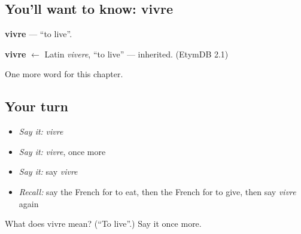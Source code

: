 \subsection*{You'll want to know: vivre}
\textbf{vivre} — \textquotedblleft{}to live\textquotedblright{}.

\begin{cousinweb}
\textbf{vivre} $\leftarrow$ Latin \emph{vivere}, \textquotedblleft{}to live\textquotedblright{} — inherited. (EtymDB 2.1)
\end{cousinweb}

\begin{grammarlens}[title={What you've built}]
One more word for this chapter.
\end{grammarlens}

\subsection*{Your turn}
\begin{itemize}
\raggedright
  \item \emph{Say it:} \emph{vivre}
  \item \emph{Say it:} \emph{vivre}, once more
  \item \emph{Say it:} say \emph{vivre}
  \item \emph{Recall:} say the French for to eat, then the French for to give, then say \emph{vivre} again
\end{itemize}

\begin{tcolorbox}[breakable,colback=teal!4,colframe=teal!35!black,title={Before you move on}]
What does vivre mean? (\textquotedblleft{}To live\textquotedblright{}.) Say it once more.
\end{tcolorbox}
